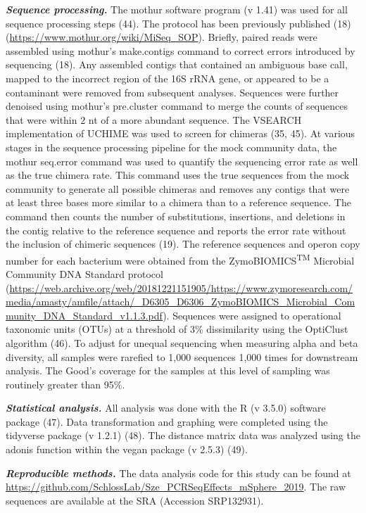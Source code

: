 \documentclass[11pt,]{article}
\begin{document}
\textbf{\emph{Sequence processing.}} The mothur software program (v
1.41) was used for all sequence processing steps (44). The protocol has
been previously published (18)
(\url{https://www.mothur.org/wiki/MiSeq_SOP}). Briefly, paired reads
were assembled using mothur's make.contigs command to correct errors
introduced by sequencing (18). Any assembled contigs that contained an
ambiguous base call, mapped to the incorrect region of the 16S rRNA
gene, or appeared to be a contaminant were removed from subsequent
analyses. Sequences were further denoised using mothur's pre.cluster
command to merge the counts of sequences that were within 2 nt of a more
abundant sequence. The VSEARCH implementation of UCHIME was used to
screen for chimeras (35, 45). At various stages in the sequence
processing pipeline for the mock community data, the mothur seq.error
command was used to quantify the sequencing error rate as well as the
true chimera rate. This command uses the true sequences from the mock
community to generate all possible chimeras and removes any contigs that
were at least three bases more similar to a chimera than to a reference
sequence. The command then counts the number of substitutions,
insertions, and deletions in the contig relative to the reference
sequence and reports the error rate without the inclusion of chimeric
sequences (19). The reference sequences and operon copy number for each
bacterium were obtained from the ZymoBIOMICS\textsuperscript{TM}
Microbial Community DNA Standard protocol
(\url{https://web.archive.org/web/20181221151905/https://www.zymoresearch.com/media/amasty/amfile/attach/_D6305_D6306_ZymoBIOMICS_Microbial_Community_DNA_Standard_v1.1.3.pdf}).
Sequences were assigned to operational taxonomic units (OTUs) at a
threshold of 3\% dissimilarity using the OptiClust algorithm (46). To
adjust for unequal sequencing when measuring alpha and beta diversity,
all samples were rarefied to 1,000 sequences 1,000 times for downstream
analysis. The Good's coverage for the samples at this level of sampling
was routinely greater than 95\%.

\textbf{\emph{Statistical analysis.}} All analysis was done with the R
(v 3.5.0) software package (47). Data transformation and graphing were
completed using the tidyverse package (v 1.2.1) (48). The distance
matrix data was analyzed using the adonis function within the vegan
package (v 2.5.3) (49).

\textbf{\emph{Reproducible methods.}} The data analysis code for this
study can be found at
\url{https://github.com/SchlossLab/Sze_PCRSeqEffects_mSphere_2019}. The
raw sequences are available at the SRA (Accession SRP132931).
\end{document}

